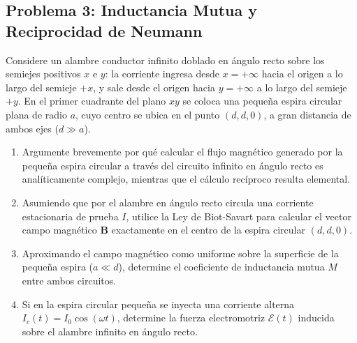 \documentclass[11pt]{article}
\begin{document}
\subsection*{Problema 3: Inductancia Mutua y Reciprocidad de Neumann}
Considere un alambre conductor infinito doblado en ángulo recto sobre los semiejes positivos $x$ e $y$: la corriente ingresa desde $x = +\infty$ hacia el origen a lo largo del semieje $+x$, y sale desde el origen hacia $y = +\infty$ a lo largo del semieje $+y$. En el primer cuadrante del plano $xy$ se coloca una pequeña espira circular plana de radio $a$, cuyo centro se ubica en el punto $(d, d, 0)$, a gran distancia de ambos ejes ($d \gg a$).
\begin{enumerate}
    \item[a)] Argumente brevemente por qué calcular el flujo magnético generado por la pequeña espira circular a través del circuito infinito en ángulo recto es analíticamente complejo, mientras que el cálculo recíproco resulta elemental.
    \item[b)] Asumiendo que por el alambre en ángulo recto circula una corriente estacionaria de prueba $I$, utilice la Ley de Biot-Savart para calcular el vector campo magnético $\mathbf{B}$ exactamente en el centro de la espira circular $(d, d, 0)$.
    \item[c)] Aproximando el campo magnético como uniforme sobre la superficie de la pequeña espira ($a \ll d$), determine el coeficiente de inductancia mutua $M$ entre ambos circuitos.
    \item[d)] Si en la espira circular pequeña se inyecta una corriente alterna $I_c(t) = I_0 \cos(\omega t)$, determine la fuerza electromotriz $\mathcal{E}(t)$ inducida sobre el alambre infinito en ángulo recto.
\end{enumerate}
\end{document}

